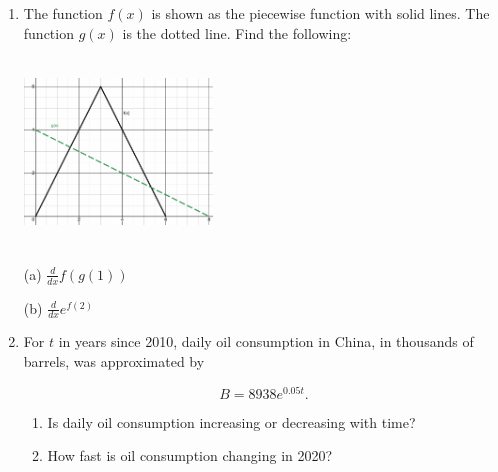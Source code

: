 \documentclass[12pt]{article}
\begin{document}
\begin{enumerate}
~
\item The function $f(x)$ is shown as the piecewise function with solid lines. The function $g(x)$ is the dotted line. Find the following:\\
\noindent\begin{minipage}{0.3\textwidth}%
\includegraphics [height=50mm, width=50mm]{3_4_piece}
\end{minipage}%
\hspace{40mm}
\begin{minipage}{0.6\textwidth}
(a) $\displaystyle \frac{d}{dx}f\left(g\left(1\right)\right)$\\
\vspace{10mm}

(b) $\displaystyle \frac{d}{dx}e^{f\left(2\right)}$

\vspace{10mm}
\end{minipage}


\vfill


\item For $t$ in years since 2010, daily oil consumption in China, in thousands of barrels, was approximated by

$$B=8938e^{0.05t}.$$
	\begin{enumerate}
	\item Is daily oil consumption increasing or decreasing with time?
	\vfill
	\item How fast is oil consumption changing in 2020?
	\vfill
	\end{enumerate}
	\vfill

\end{enumerate}
\end{document}
